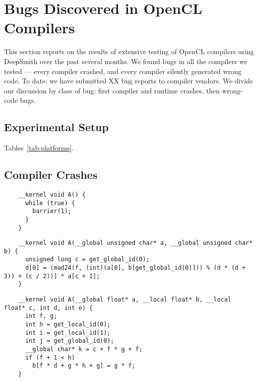 \section{Bugs Discovered in OpenCL Compilers}

This section reports on the results of extensive testing of OpenCL compilers using DeepSmith over the past several months. We found bugs in all the compilers we tested --- every compiler crashed, and every compiler silently generated wrong code. To date, we have submitted XX bug reports to compiler vendors. We divide our discussion by class of bug: first compiler and runtime crashes, then wrong-code bugs.


\subsection{Experimental Setup}

Tables~\ref{tab:platforms}.

\subsection{Compiler Crashes}

\newsavebox{\IntelVectorizerSegfault}
\begin{lrbox}{\IntelVectorizerSegfault}
  \hspace{1.5em}
  \begin{lstlisting}
    __kernel void A() {
      while (true) {
        barrier(1);
      }
    }
  \end{lstlisting}
\end{lrbox}


\newsavebox{\OclgrindSemaAssertion}
\begin{lrbox}{\OclgrindSemaAssertion}
  \hspace{1.5em}
  \begin{lstlisting}
    __kernel void A(__global unsigned char* a, __global unsigned char* b) {
      unsigned long c = get_global_id(0);
      d[0] = (mad24(f, (int)(a[0], b[get_global_id(0)])) % (d * (d + 3)) + (c / 2))] * a[c + 1];
    }
  \end{lstlisting}
\end{lrbox}

\newsavebox{\NvidiaCompileSegfault}
\begin{lrbox}{\NvidiaCompileSegfault}
  \hspace{1.5em}
  \begin{lstlisting}
    __kernel void A(__global float* a, __local float* b, __local float* c, int d, int e) {
      int f, g;
      int h = get_local_id(0);
      int i = get_local_id(1);
      int j = get_global_id(0);
      __global char* k = c + f * g + f;
      if (f + 1 < h)
        b[f * d + g * h + g] = g * f;
    }
  \end{lstlisting}
\end{lrbox}

